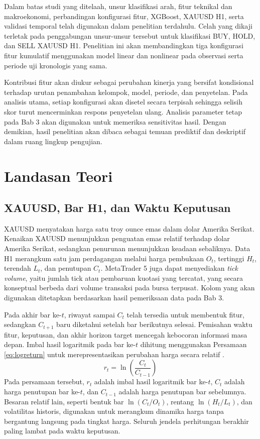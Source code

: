 Dalam batas studi yang ditelaah, unsur klasifikasi arah, fitur teknikal dan makroekonomi, perbandingan konfigurasi fitur, XGBoost, XAUUSD H1, serta validasi temporal telah digunakan dalam penelitian terdahulu. Celah yang dikaji terletak pada penggabungan unsur-unsur tersebut untuk klasifikasi BUY, HOLD, dan SELL XAUUSD H1. Penelitian ini akan membandingkan tiga konfigurasi fitur kumulatif menggunakan model linear dan nonlinear pada observasi serta periode uji kronologis yang sama.

Kontribusi fitur akan diukur sebagai perubahan kinerja yang bersifat kondisional terhadap urutan penambahan kelompok, model, periode, dan penyetelan. Pada analisis utama, setiap konfigurasi akan disetel secara terpisah sehingga selisih skor turut mencerminkan respons penyetelan ulang. Analisis parameter tetap pada Bab 3 akan digunakan untuk memeriksa sensitivitas hasil. Dengan demikian, hasil penelitian akan dibaca sebagai temuan prediktif dan deskriptif dalam ruang lingkup pengujian.

\section{Landasan Teori}

\subsection{XAUUSD, Bar H1, dan Waktu Keputusan}

XAUUSD menyatakan harga satu troy ounce emas dalam dolar Amerika Serikat. Kenaikan XAUUSD menunjukkan penguatan emas relatif terhadap dolar Amerika Serikat, sedangkan penurunan menunjukkan keadaan sebaliknya. Data H1 merangkum satu jam perdagangan melalui harga pembukaan $O_t$, tertinggi $H_t$, terendah $L_t$, dan penutupan $C_t$. MetaTrader 5 juga dapat menyediakan \emph{tick volume}, yaitu jumlah tick atau pembaruan kuotasi yang tercatat, yang secara konseptual berbeda dari volume transaksi pada bursa terpusat. Kolom yang akan digunakan ditetapkan berdasarkan hasil pemeriksaan data pada Bab 3.

Pada akhir bar ke-$t$, riwayat sampai $C_t$ telah tersedia untuk membentuk fitur, sedangkan $C_{t+1}$ baru diketahui setelah bar berikutnya selesai. Pemisahan waktu fitur, keputusan, dan akhir horizon target mencegah kebocoran informasi masa depan. Imbal hasil logaritmik pada bar ke-$t$ dihitung menggunakan Persamaan \ref{eq:logreturn} untuk merepresentasikan perubahan harga secara relatif \parencite{tsay2010analysis}.
\begin{equation}
r_t=\ln\left(\frac{C_t}{C_{t-1}}\right)
\label{eq:logreturn}
\end{equation}
Pada persamaan tersebut, $r_t$ adalah imbal hasil logaritmik bar ke-$t$, $C_t$ adalah harga penutupan bar ke-$t$, dan $C_{t-1}$ adalah harga penutupan bar sebelumnya. Besaran relatif lain, seperti bentuk bar $\ln(C_t/O_t)$, rentang $\ln(H_t/L_t)$, dan volatilitas historis, digunakan untuk merangkum dinamika harga tanpa bergantung langsung pada tingkat harga. Seluruh jendela perhitungan berakhir paling lambat pada waktu keputusan.

